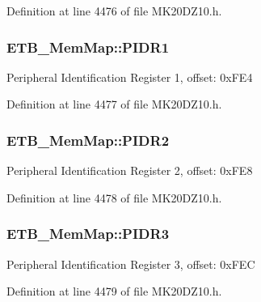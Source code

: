 Definition at line 4476 of file M\+K20\+D\+Z10.\+h.

\subsubsection[{\texorpdfstring{P\+I\+D\+R1}{PIDR1}}]{ E\+T\+B\+\_\+\+Mem\+Map\+::\+P\+I\+D\+R1}\hypertarget{struct_e_t_b___mem_map_a608af25e75d3f8e98b484e53c286aaed}{}\label{struct_e_t_b___mem_map_a608af25e75d3f8e98b484e53c286aaed}
Peripheral Identification Register 1, offset\+: 0x\+F\+E4 

Definition at line 4477 of file M\+K20\+D\+Z10.\+h.

\subsubsection[{\texorpdfstring{P\+I\+D\+R2}{PIDR2}}]{ E\+T\+B\+\_\+\+Mem\+Map\+::\+P\+I\+D\+R2}\hypertarget{struct_e_t_b___mem_map_a29cf14afb49d11bc1c1ab4df4b9b23f5}{}\label{struct_e_t_b___mem_map_a29cf14afb49d11bc1c1ab4df4b9b23f5}
Peripheral Identification Register 2, offset\+: 0x\+F\+E8 

Definition at line 4478 of file M\+K20\+D\+Z10.\+h.

\subsubsection[{\texorpdfstring{P\+I\+D\+R3}{PIDR3}}]{ E\+T\+B\+\_\+\+Mem\+Map\+::\+P\+I\+D\+R3}\hypertarget{struct_e_t_b___mem_map_aca8df6dc059f2ca8eb432f2f74a09149}{}\label{struct_e_t_b___mem_map_aca8df6dc059f2ca8eb432f2f74a09149}
Peripheral Identification Register 3, offset\+: 0x\+F\+EC 

Definition at line 4479 of file M\+K20\+D\+Z10.\+h.

